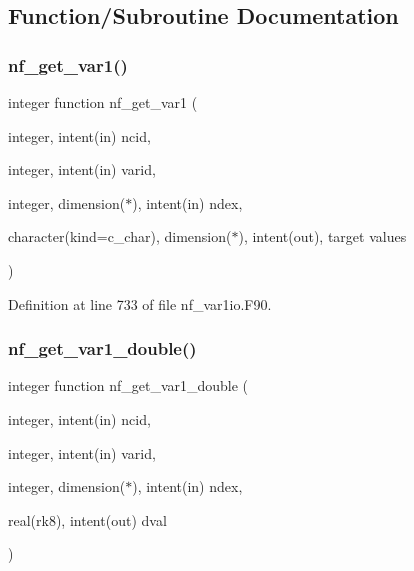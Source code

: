 \subsection{Function/\+Subroutine Documentation}
\mbox{\label{nf__var1io_8F90_aa054a511ec22cb03251956807ceef553}} 
\subsubsection{\texorpdfstring{nf\+\_\+get\+\_\+var1()}{nf\_get\_var1()}}
{\footnotesize\ttfamily integer function nf\+\_\+get\+\_\+var1 (\begin{DoxyParamCaption}\item[{integer, intent(in)}]{ncid,  }\item[{integer, intent(in)}]{varid,  }\item[{integer, dimension($\ast$), intent(in)}]{ndex,  }\item[{character(kind=c\+\_\+char), dimension($\ast$), intent(out), target}]{values }\end{DoxyParamCaption})}



Definition at line 733 of file nf\+\_\+var1io.\+F90.

\mbox{\label{nf__var1io_8F90_a517f82bf8478607ab1d561aa704fd770}} 
\subsubsection{\texorpdfstring{nf\+\_\+get\+\_\+var1\+\_\+double()}{nf\_get\_var1\_double()}}
{\footnotesize\ttfamily integer function nf\+\_\+get\+\_\+var1\+\_\+double (\begin{DoxyParamCaption}\item[{integer, intent(in)}]{ncid,  }\item[{integer, intent(in)}]{varid,  }\item[{integer, dimension($\ast$), intent(in)}]{ndex,  }\item[{real(rk8), intent(out)}]{dval }\end{DoxyParamCaption})}



